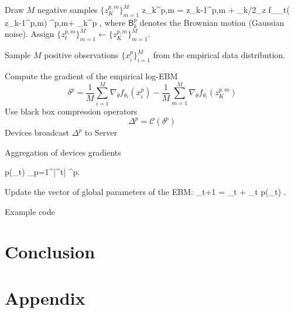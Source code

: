\documentclass[11pt]{article}
\begin{document}
\begin{algorithm}[H]
\DontPrintSemicolon
  
\hrulefill

{	
	
	{
		{Draw $M$ negative samples $\{ z_{K}^{p,m} \}_{m=1}^M$} 
			{
			\beq\notag
			z_{k}^{p,m} = z_{k-1}^{p,m} + \gamma_k/2\nabla_z f_{\theta_t}( z_{k-1}^{p,m})  ^{p,m}+  _k^p \eqsp,
			\eeq
			where $\mathsf{B}_k^p$ denotes the Brownian motion (Gaussian noise).
			}
		{Assign $\{ z_{t}^{p,m} \}_{m=1}^M \leftarrow \{ z_{K}^{p,m} \}_{m=1}^M$.}
		
		{Sample $M$ positive observations $\{ x^p_{i} \}_{i=1}^M$ from the empirical data distribution.}
		
		{Compute the gradient of the empirical log-EBM} 
		{
		$$\delta^p = \frac{1}{M} \sum_{i=1}^{M} \nabla_{\theta} f_{\theta_t}\left(x^p_{i}\right)- \frac{1}{M} 	\sum_{m=1}^{M} \nabla_{\theta} f_{\theta_t}\left(z_K^{p,m}\right)$$
		}
		{Use black box compression operators}
		{
		$$\Delta^p = \mathcal{C}(\delta^p )$$
		}
		{Devices broadcast $\Delta^p$ to Server} 
	}
	
	  
	{Aggregation of devices gradients}
	{
	\beq\notag
	\begin{split}
	\nabla \log p(\theta_t) 
	\approx  {} \sum_{p=1}^{|^t|} \Delta^p\eqsp.
	\end{split}
	\eeq
	}
	{Update the vector of global parameters of the EBM:}
	{
	\beq\notag
	\theta_{t+1} = \theta_{t} + \eta_t \nabla \log p(\theta_t) \eqsp.
	\eeq
	}
}
\caption{Example code}
\end{algorithm}

\section{Conclusion}\label{sec:conclusion}



\newpage



\newpage
\appendix 

\section{Appendix}\label{sec:appendix}


\end{document}
